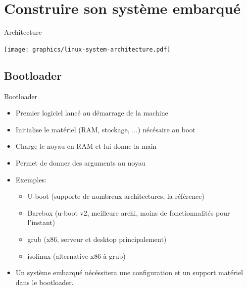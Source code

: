 \section{Construire son système embarqué}

\begin{frame}{Architecture}{}
  \begin{center}
    \texttt{[image: graphics/linux-system-architecture.pdf]}
  \end{center}
\end{frame}

\subsection{Bootloader}
\begin{frame}{Bootloader}{}
  \begin{itemize}
  \item Premier logiciel lancé au démarrage de la machine
  \item Initialise le matériel (RAM, stockage, ...) nécésaire au boot
  \item Charge le noyau en RAM et lui donne la main
  \item Permet de donner des arguments au noyau
  \item Exemples:
    \begin{itemize}
    \item U-boot (supporte de nombreux architectures, la référence)
    \item Barebox (u-boot v2, meilleure archi, moins de fonctionnalités pour l'instant)
    \item grub (x86, serveur et desktop principalement)
    \item isolinux (alternative x86 à grub)
    \end{itemize}
  \item Un système embarqué nécéssitera une configuration et un support matériel dans le bootloader.
  \end{itemize}
\end{frame}

